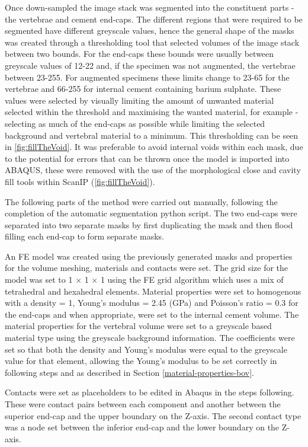 Once down-sampled the image stack was segmented into the constituent
parts - the vertebrae and cement end-caps. The different regions that
were required to be segmented have different greyscale values, hence the
general shape of the masks was created through a thresholding tool that
selected volumes of the image stack between two bounds. For the end-caps
these bounds were usually between greyscale values of 12-22 and, if the
specimen was not augmented, the vertebrae between 23-255. For augmented
specimens these limits change to 23-65 for the vertebrae and 66-255 for
internal cement containing barium sulphate. These values were selected by visually limiting the amount of unwanted material selected within the threshold and maximising the wanted material, for example - selecting as much of the end-caps as possible while limiting the selected background and vertebral material to a minimum. This thresholding can be seen in \cref{fig:fillTheVoid}.
 It was preferable to avoid
internal voids within each mask, due to the potential for errors that
can be thrown once the model is imported into ABAQUS, these were
removed with the use of the morphological close and cavity fill tools within ScanIP (\cref{fig:fillTheVoid}).





The following parts of the method were carried out manually, following the completion of the automatic segmentation python script. The two end-caps were separated into two
separate masks by first duplicating the mask and then flood filling each end-cap to form separate masks.

An FE model was created using the previously generated masks and properties for the volume meshing, materials and contacts were set. The grid size for the model was set to 1 $\times$ 1 $\times$ 1 using the FE grid algorithm which uses a mix of tetrahedral and hexahedral elements. Material properties were set to homogenous with a density = 1, Young's modulus = 2.45 (GPa) and Poisson's ratio = 0.3 for the end-caps and when appropriate, were set to the internal cement volume. The material
properties for the vertebral volume were set to a greyscale based material type using the greyscale background information. The coefficients were set so that both the density and Young's modulus were equal to the greyscale value for that element, allowing the Young's modulus to be set correctly in following steps and as described in Section \ref{material-properties-bov}.

Contacts were set as placeholders to be edited in Abaqus in the steps following. These were contact pairs between each component and another between the superior end-cap and the upper boundary on the Z-axis. The second contact type was a node set between the inferior end-cap and the lower boundary on the Z-axis.

